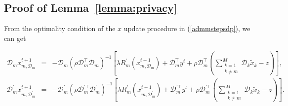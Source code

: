 \subsection{Proof of Lemma~\ref{lemma:privacy}}
From the optimality condition of the $x$ update procedure in (\ref{admmstepsdp}), we can get

\begin{eqnarray*}
  \mathcal{D}_mx_{m,\mathcal{D}_m}^{t+1}&=&-\mathcal{D}_m(\rho \mathcal{D}_m^\top \mathcal{D}_m)^{-1}
  \left[
  \lambda R_m^{\prime}(x_{m,\mathcal{D}_m}^{t+1})+\mathcal{D}_m^\top y^t+\rho\mathcal{D}_m^\top(\sum_{\substack
{k=1\\k\neq m}}^{M}\mathcal{D}_k\tilde{x}_k-z)
  \right],\\
    \mathcal{D}_m^{\prime}x_{m,\mathcal{D}_m^{\prime}}^{t+1}&=&-\mathcal{D}_m^{\prime}(\rho \mathcal{D}_m^{\prime\top} \mathcal{D}_m^{\prime})^{-1}
  \left[
  \lambda R_m^{\prime}(x_{m,\mathcal{D}_m^{\prime}}^{t+1})+\mathcal{D}_m^{\prime\top}y^t+\rho
  \mathcal{D}_m^{\prime\top}(\sum_{\substack
{k=1\\k\neq m}}^{M}\mathcal{D}_k\tilde{x}_k-z)
  \right].
\end{eqnarray*}






